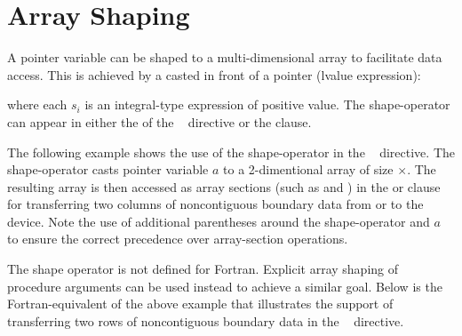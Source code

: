\section{Array Shaping}
\label{sec:array-shaping}

\ccppspecificstart
A pointer variable can be shaped to a multi-dimensional array to facilitate
data access. This is achieved by a  casted in front of 
a pointer (lvalue expression):
\begin{description}
\item[]\hspace*{5mm}
\end{description}
where each $s_i$ is an integral-type expression of positive value.
The shape-operator can appear in either the 
of the ~ directive or the  clause.

The following example shows the use of the shape-operator in the 
~ directive. The shape-operator \code{([nx][ny+2])}
casts pointer variable $a$ to a 2-dimentional array of size
$\times$.  The resulting array is then accessed as
array sections (such as \code{[0:nx][1]} and \code{[0:nx][ny]}) 
in the  or  clause for transferring two columns of 
noncontiguous boundary data from or to the device.  
Note the use of additional parentheses
around the shape-operator and $a$ to ensure the correct precedence 
over array-section operations.

\ccppspecificend

The shape operator is not defined for Fortran.  Explicit array shaping
of procedure arguments can be used instead to achieve a similar goal.
Below is the Fortran-equivalent of the above example that illustrates
the support of transferring two rows of noncontiguous boundary
data in the ~ directive.
 
